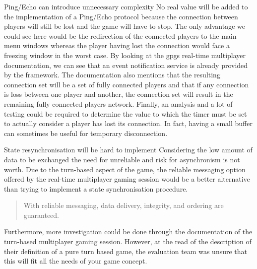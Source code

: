 
\begin{description}[style=nextline]
  \item[R1\label{r1}] Ping/Echo can introduce unnecessary complexity
    \vspace{\baselineskip}
    \newline
    No real value will be added to the implementation of a Ping/Echo protocol because the connection between players will still be lost and the game will have to stop. The only advantage we could see here would be the redirection of the connected players to the main menu windows whereas the player having lost the connection would face a freezing window in the worst case. By looking at the \gls{gpgs} real-time multiplayer documentation, we can see that an event notification service is already provided by the framework. The documentation also mentions that the resulting connection set will be a set of fully connected players and that if any connection is loss between one player and another, the connection set will result in the remaining fully connected players network. \cite[Connected Set]{realTimeMultiplayerGPGS}
    \vspace{\baselineskip}
    \newline
    Finally, an analysis and a lot of testing could be required to determine the value to which the timer must be set to actually consider a player has lost its connection. In fact, having a small buffer can sometimes be useful for temporary disconnection.

  \item[R2\label{r2}] State resynchronisation will be hard to implement
    \vspace{\baselineskip}
    \newline
    Considering the low amount of data to be exchanged the need for unreliable and risk for asynchronism is not worth. Due to the turn-based aspect of the game, the reliable messaging option offered by the real-time multiplayer gaming session would be a better alternative than trying to implement a state synchronisation procedure.
    \begin{quote}
      With reliable messaging, data delivery, integrity, and ordering are guaranteed. \cite[Sending Game Data, Reliable Messaging]{realTimeMultiplayerGPGS}
    \end{quote}
    Furthermore, more investigation could be done through the documentation of the turn-based multiplayer gaming session. However, at the read of the description of their definition of a pure turn based game, the evaluation team was unsure that this will fit all the needs of your game concept. \cite{turnBasedMultiplayerGPGS}


\end{description}
